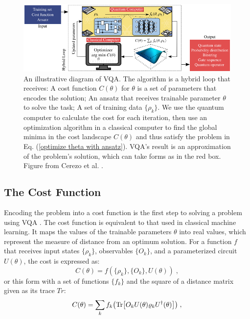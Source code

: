 \begin{figure}
    \centering
    \includegraphics[width=\textwidth]{LiteratureReview/Appendices/vqadiagram.png}
    \caption{
    An illustrative diagram of VQA. 
    The algorithm is a hybrid loop that receives: 
    A cost function $C(\theta)$ for $\theta$ is a set of parameters that encodes the solution; 
    An ansatz that receives trainable parameter $\theta$ to solve the task;
    A set of training data $\{\rho_k\}$.
    We use the quantum computer to calculate the cost for each iteration, then use an optimization algorithm in a classical computer to find the global minima in the cost landscape $C(\theta)$ and thus satisfy the problem in Eq. (\ref{optimize theta with ansatz}).
    VQA's result is an approximation of the problem's solution, which can take forms as in the red box.
    Figure from Cerezo et al. \cite{cerezo2021variational}.
    }
    \label{VQA diagram}
\end{figure}

\subsection{The Cost Function}
Encoding the problem into a cost function is the first step to solving a problem using VQA \cite{cerezo2021variational}.
The cost function is equivalent to that used in classical machine learning. 
It maps the values of the trainable parameters $\theta$ into real values, which represent the measure of distance from an optimum solution.
For a function $f$ that receives input states $\{\rho_k\}$, observables $\{O_k\}$, and a parameterized circuit $U(\theta)$, the cost is expressed as:
\begin{equation}
    C(\theta) = f(\{\rho_k\}, \{O_k\}, U(\theta)) \;,
\end{equation}
or this form with a set of functions $\{ f_k \}$ and the square of a distance matrix given as its trace $Tr$:
\begin{equation}
    C(\theta) = \sum_k f_k \left(\Tr[ O_k U(\theta) \rho_k U^\dagger(\theta) ]\right) \;,
    \label{Cost function}
\end{equation}

